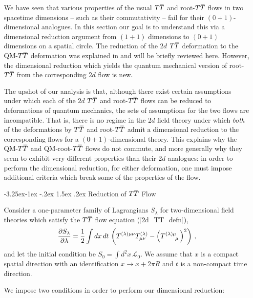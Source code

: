 \documentclass[12pt]{article}
\makeatletter
\numberwithin{equation}{section}
\renewcommand\subsection{\@startsection{subsection}{2}{\z@}%
                                     {-3.25ex\@plus -1ex \@minus -.2ex}%
                                     {1.5ex \@plus .2ex}%
                                     {\normalfont\bfseries}}
\newcommand{\overbar}[1]{\mkern 1.5mu\overline{\mkern-1.5mu#1\mkern-1.5mu}\mkern 1.5mu}
\def\TT{{T\overbar{T}}}
\makeatother
\begin{document}
We have seen that various properties of the usual $\TT$ and root-$\TT$ flows in two spacetime dimensions -- such as their commutativity -- fail for their $(0+1)$-dimensional analogues. In this section our goal is to understand this via a dimensional reduction argument from $(1+1)$ dimensions to $(0+1)$ dimensions on a spatial circle. The reduction of the $2d$ $\TT$ deformation to the QM-$\TT$ deformation was explained in \cite{Gross:2019ach,Gross:2019uxi} and will be briefly reviewed here. However, the dimensional reduction which yields the quantum mechanical version of root-$\TT$ from the corresponding $2d$ flow is new.

The upshot of our analysis is that, although there exist certain assumptions under which each of the $2d$ $\TT$ and root-$\TT$ flows can be reduced to deformations of quantum mechanics, the sets of assumptions for the two flows are incompatible. That is, there is no regime in the $2d$ field theory under which \emph{both} of the deformations by $\TT$ and root-$\TT$ admit a dimensional reduction to the corresponding flows for a $(0+1)$-dimensional theory. This explains why the QM-$\TT$ and QM-root-$\TT$ flows do not commute, and more generally why they seem to exhibit very different properties than their $2d$ analogues: in order to perform the dimensional reduction, for either deformation, one must impose additional criteria which break some of the properties of the flow.

\subsection{Reduction of $\TT$ Flow}

Consider a one-parameter family of Lagrangians $S_\lambda$ for two-dimensional field theories which satisfy the $\TT$ flow equation (\ref{2d_TT_defn}),
%
\begin{align}\label{TT_flow_eqn_reduction}
    \frac{\partial S_\lambda}{\partial \lambda} = \frac{1}{2} \int d x \, dt \, \left( T^{(\lambda) \mu \nu} T^{(\lambda)}_{\mu \nu} - \left( \tensor{T}{^{(\lambda)}^\mu_\mu} \right)^2 \right) \, ,
\end{align}
%
and let the initial condition be $S_0 = \int d^2 x \, \mathcal{L}_0$. We assume that $x$ is a compact spatial direction with an identification $x \to x + 2 \pi R$ and $t$ is a non-compact time direction.

We impose two conditions in order to perform our dimensional reduction:
\end{document}
